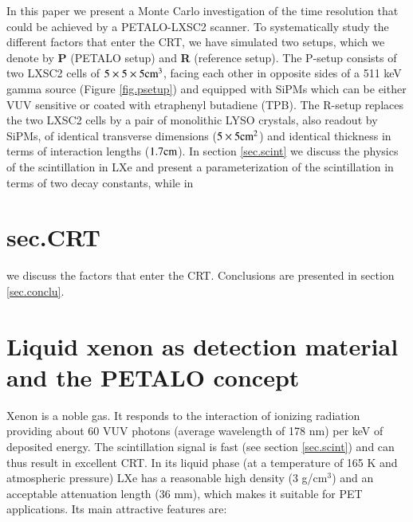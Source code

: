 \documentclass[review]{elsarticle}
\begin{document}
In this paper we present a Monte Carlo investigation of the time resolution
that could be achieved by a PETALO-LXSC2 scanner. To systematically study the different factors that enter the CRT, we have simulated two  setups, which we denote by {\bf P} (PETALO setup) and {\bf R} (reference setup). The P-setup consists of two LXSC2 cells of 
$5 \times 5 \times 5 {\rm cm^3}$, facing each other in opposite sides of a 511 keV gamma source 
(Figure \ref{fig.psetup}) and equipped with SiPMs which can be either VUV sensitive or coated with etraphenyl butadiene (TPB). The R-setup replaces the two LXSC2 cells by a pair of  monolithic LYSO crystals, also readout by SiPMs, of identical transverse dimensions ($5 \times 5 {\rm cm^2}$) and identical thickness in terms of interaction lengths ($1.7 {\rm cm}$).  In section \ref{sec.scint} we discuss the physics of the scintillation in LXe and present a parameterization of the scintillation in terms of two decay constants, while in \section{sec.CRT} we discuss the factors that enter the CRT. Conclusions are presented in section \ref{sec.conclu}. 

\section{Liquid xenon as detection material and the PETALO concept}
\label{sec.LXe}

Xenon is a noble gas. It responds to the interaction of ionizing radiation providing about 60 VUV photons (average wavelength of 178 nm) per keV of deposited energy. The scintillation signal is fast 
(see section \ref{sec.scint}) and can thus result in excellent CRT.  In its liquid phase (at a temperature of 165 K and atmospheric pressure) LXe has a reasonable high density (3 g/cm$^3$) and an acceptable attenuation length (36 mm), which makes it suitable for PET applications. Its main attractive features are:
\end{document}

